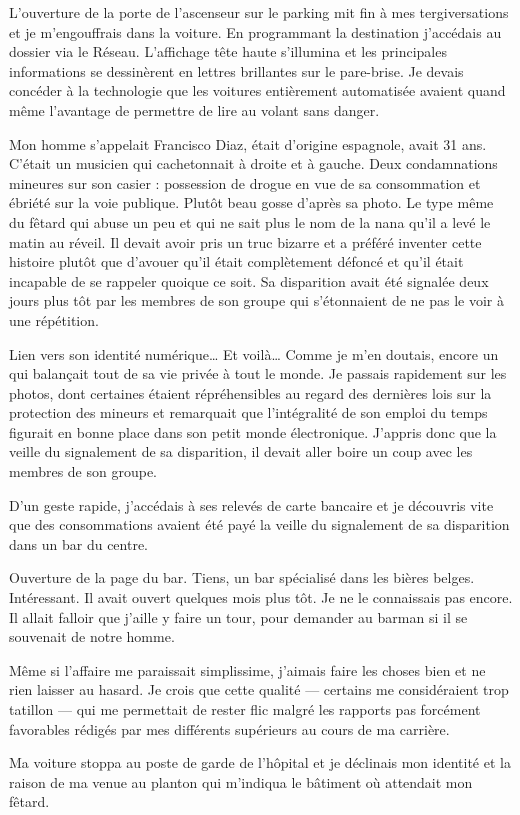 L'ouverture de la porte de l'ascenseur sur le parking mit fin à mes tergiversations et je m'engouffrais dans la
voiture. En programmant la destination j'accédais au dossier via le Réseau. L'affichage tête haute s'illumina et les
principales informations se dessinèrent en lettres brillantes sur le pare-brise. Je devais concéder à la technologie
que les voitures entièrement automatisée avaient quand même l'avantage de permettre de lire au volant sans danger.

Mon homme s'appelait Francisco Diaz, était d'origine espagnole, avait 31 ans. C'était un musicien qui cachetonnait à
droite et à gauche. Deux condamnations mineures sur son casier : possession de drogue en vue de sa consommation et
ébriété sur la voie publique. Plutôt beau gosse d'après sa photo. Le type même du fêtard qui abuse un peu et qui ne sait
plus le nom de la nana qu'il a levé le matin au réveil. Il devait avoir pris un truc bizarre et a préféré inventer cette
histoire plutôt que d'avouer qu'il était complètement défoncé et qu'il était incapable de se rappeler quoique ce soit.
Sa disparition avait été signalée deux jours plus tôt par les membres de son groupe qui s'étonnaient de ne pas le voir à
une répétition.

Lien vers son identité numérique… Et voilà… Comme je m'en doutais, encore un qui balançait tout de sa vie privée à tout
le monde. Je passais rapidement sur les photos, dont certaines étaient répréhensibles au regard des dernières lois sur
la protection des mineurs et remarquait que l'intégralité de son emploi du temps figurait en bonne place dans son petit
monde électronique. J'appris donc que la veille du signalement de sa disparition, il devait aller boire un coup avec
les membres de son groupe.

D'un geste rapide, j'accédais à ses relevés de carte bancaire et je découvris vite que des consommations avaient été
payé la veille du signalement de sa disparition dans un bar du centre.

Ouverture de la page du bar. Tiens, un bar spécialisé dans les bières belges. Intéressant. Il avait ouvert quelques
mois plus tôt. Je ne le connaissais pas encore. Il allait falloir que j'aille y faire un tour, pour demander au barman
si il se souvenait de notre homme.

Même si l'affaire me paraissait simplissime, j'aimais faire les choses bien et ne rien laisser au hasard. Je crois que
cette qualité — certains me considéraient trop tatillon — qui me permettait de rester flic malgré les rapports pas
forcément favorables rédigés par mes différents supérieurs au cours de ma carrière.

Ma voiture stoppa au poste de garde de l'hôpital et je déclinais mon identité et la raison de ma venue au planton qui
m'indiqua le bâtiment où attendait mon fêtard.